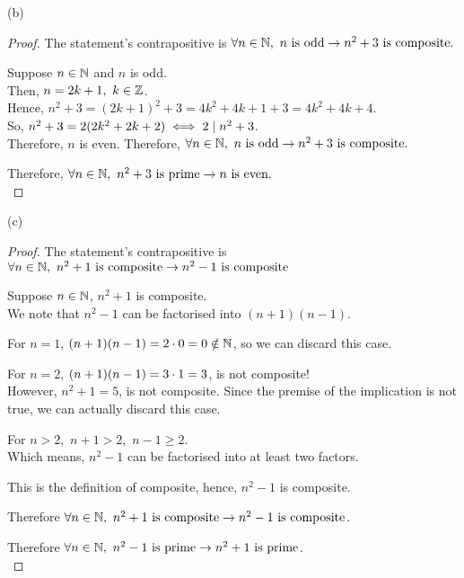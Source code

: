 \documentclass[a4paper,12pt]{report}
\begin{document}
\sol (b)
\begin{proof}
	The statement's contrapositive is $\forall n\in\mathbb{N},\ n \text{ is odd} \rightarrow n^2+3 \text{ is composite}.$
	\begin{list}{}{\setlength{\leftmargin}{1in}\setlength{\topsep}{0pt}}\item
		Suppose $n\in\mathbb{N}$ and $n$ is odd. \\
		Then, $n = 2k+1,\ k\in\mathbb{Z}$. \\
		Hence, $n^2+3 = (2k+1)^2+3 = 4k^2 + 4k + 1 + 3 = 4k^2 + 4k + 4$. \\
		So, $n^2 + 3 = 2(2k^2 + 2k + 2) \iff 2\mathrel{\mid} n^2 + 3$. \\
		Therefore, $n$ is even.
		Therefore, $\forall n\in\mathbb{N},\ n \text{ is odd} \rightarrow n^2+3 \text{ is composite}.$ \\
	\end{list}
	Therefore, $\forall n\in\mathbb{N},\ n^2+3 \text{ is prime} \rightarrow n \text{ is even}.$ \\
\end{proof}

\sol (c)
\begin{proof}
	The statement's contrapositive is $\forall n\in\mathbb{N},\ n^2 + 1 \text{ is composite} \rightarrow n^2 - 1 \text{ is composite}$
	\begin{list}{}{\setlength{\leftmargin}{1in}\setlength{\topsep}{0pt}}\item
		Suppose $n\in\mathbb{N}$, $n^2 + 1$ is composite. \\
		We note that $n^2 - 1$ can be factorised into $(n+1)(n-1)$.

		For $n{=}1$, $(n+1)(n-1) = 2\cdot0 = 0 \notin \mathbb{N}$, so we can discard this case.

		For $n{=}2$, $(n+1)(n-1) = 3\cdot1 = 3$, is not composite! \\
		However, $n^2 + 1 = 5$, is not composite. Since the premise of the implication is not true, we can actually discard this case.

		For $n{>}2$,\ $n+1 > 2$,\ $n-1 \geq 2 $. \\
		Which means, $n^2 - 1$ can be factorised into at least two factors.

		This is the definition of composite, hence, $n^2 - 1$ is composite.

		Therefore $\forall n\in\mathbb{N},\ n^2 + 1 \text{ is composite} \rightarrow n^2 - 1 \text{ is composite}$.\\
	\end{list}
	Therefore $\forall n\in\mathbb{N},\ n^2 - 1 \text{ is prime} \rightarrow n^2 + 1 \text{ is prime}$. \\
\end{proof}
\end{document}
